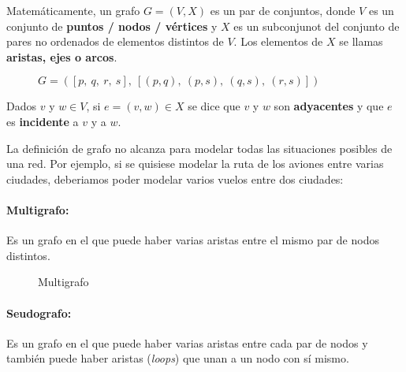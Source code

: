 Matemáticamente, un grafo \(G = (V,X)\) es un par de conjuntos, donde \(V\) es un conjunto de \textbf{puntos / nodos / vértices} y \(X\) es un subconjunot del conjunto de pares no ordenados de elementos distintos de \(V\). Los elementos de \(X\) se llamas \textbf{aristas, ejes o arcos}.

\begin{figure}[H]
\begin{center}

\end{center}
	\caption{\(G =([p,~q,~r,~s],~[(p,q),~(p,s),~(q,s),~(r,s)])\)
	}
\end{figure}

Dados \(v\) y \(w \in V\), si \(e=(v,w)\in X\) se dice que \(v\) y \(w\) son \textbf{adyacentes} y que \(e\) es \textbf{incidente} a \(v\) y a \(w\).

La definición de grafo no alcanza para modelar todas las situaciones posibles de una red. Por ejemplo, si se quisiese modelar la ruta de los aviones entre varias ciudades, deberiamos poder modelar varios vuelos entre dos ciudades:
 
\paragraph{Multigrafo:} Es un grafo en el que puede haber varias aristas entre el mismo par de nodos distintos.
		\begin{figure}[H]
	\begin{center}
	\end{center}		
	\caption{Multigrafo}
\end{figure}
\paragraph{Seudografo:} Es un grafo en el que puede haber varias aristas entre cada par de nodos y también puede haber aristas (\textit{loops}) que unan a un nodo con sí mismo.
	
